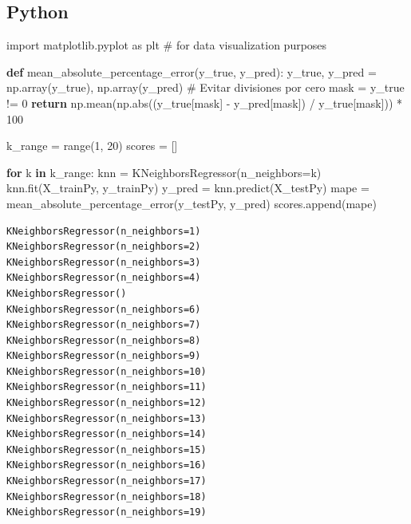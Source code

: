 \documentclass[
  letterpaper,
  DIV=11,
  numbers=noendperiod]{scrartcl}
\newenvironment{Shaded}{\begin{snugshade}}{\end{snugshade}}
\newcommand{\BuiltInTok}[1]{\textcolor[rgb]{0.00,0.23,0.31}{#1}}
\newcommand{\CommentTok}[1]{\textcolor[rgb]{0.37,0.37,0.37}{#1}}
\newcommand{\ControlFlowTok}[1]{\textcolor[rgb]{0.00,0.23,0.31}{\textbf{#1}}}
\newcommand{\DecValTok}[1]{\textcolor[rgb]{0.68,0.00,0.00}{#1}}
\newcommand{\ImportTok}[1]{\textcolor[rgb]{0.00,0.46,0.62}{#1}}
\newcommand{\KeywordTok}[1]{\textcolor[rgb]{0.00,0.23,0.31}{\textbf{#1}}}
\newcommand{\NormalTok}[1]{\textcolor[rgb]{0.00,0.23,0.31}{#1}}
\newcommand{\OperatorTok}[1]{\textcolor[rgb]{0.37,0.37,0.37}{#1}}
\begin{document}
\subsection{Python}

\begin{Shaded}
\begin{Highlighting}[]
\ImportTok{import}\NormalTok{ matplotlib.pyplot }\ImportTok{as}\NormalTok{ plt }\CommentTok{\# for data visualization purposes}

\KeywordTok{def}\NormalTok{ mean\_absolute\_percentage\_error(y\_true, y\_pred):}
\NormalTok{    y\_true, y\_pred }\OperatorTok{=}\NormalTok{ np.array(y\_true), np.array(y\_pred)}
    \CommentTok{\# Evitar divisiones por cero}
\NormalTok{    mask }\OperatorTok{=}\NormalTok{ y\_true }\OperatorTok{!=} \DecValTok{0}
    \ControlFlowTok{return}\NormalTok{ np.mean(np.}\BuiltInTok{abs}\NormalTok{((y\_true[mask] }\OperatorTok{{-}}\NormalTok{ y\_pred[mask]) }\OperatorTok{/}\NormalTok{ y\_true[mask])) }\OperatorTok{*} \DecValTok{100}

\NormalTok{k\_range }\OperatorTok{=} \BuiltInTok{range}\NormalTok{(}\DecValTok{1}\NormalTok{, }\DecValTok{20}\NormalTok{)}
\NormalTok{scores }\OperatorTok{=}\NormalTok{ []}

\ControlFlowTok{for}\NormalTok{ k }\KeywordTok{in}\NormalTok{ k\_range:}
\NormalTok{    knn }\OperatorTok{=}\NormalTok{ KNeighborsRegressor(n\_neighbors}\OperatorTok{=}\NormalTok{k)}
\NormalTok{    knn.fit(X\_trainPy, y\_trainPy)}
\NormalTok{    y\_pred }\OperatorTok{=}\NormalTok{ knn.predict(X\_testPy)}
\NormalTok{    mape }\OperatorTok{=}\NormalTok{ mean\_absolute\_percentage\_error(y\_testPy, y\_pred)}
\NormalTok{    scores.append(mape)}
\end{Highlighting}
\end{Shaded}

\begin{verbatim}
KNeighborsRegressor(n_neighbors=1)
KNeighborsRegressor(n_neighbors=2)
KNeighborsRegressor(n_neighbors=3)
KNeighborsRegressor(n_neighbors=4)
KNeighborsRegressor()
KNeighborsRegressor(n_neighbors=6)
KNeighborsRegressor(n_neighbors=7)
KNeighborsRegressor(n_neighbors=8)
KNeighborsRegressor(n_neighbors=9)
KNeighborsRegressor(n_neighbors=10)
KNeighborsRegressor(n_neighbors=11)
KNeighborsRegressor(n_neighbors=12)
KNeighborsRegressor(n_neighbors=13)
KNeighborsRegressor(n_neighbors=14)
KNeighborsRegressor(n_neighbors=15)
KNeighborsRegressor(n_neighbors=16)
KNeighborsRegressor(n_neighbors=17)
KNeighborsRegressor(n_neighbors=18)
KNeighborsRegressor(n_neighbors=19)
\end{verbatim}
\end{document}

